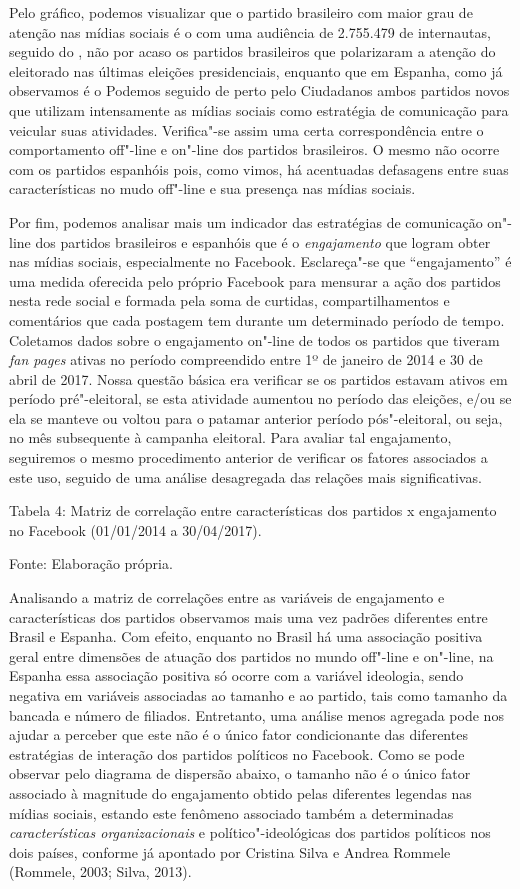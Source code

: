 Pelo gráfico, podemos visualizar que o partido brasileiro com maior grau
de atenção nas mídias sociais é o  com uma audiência de 2.755.479 de
internautas, seguido do , não por acaso os partidos brasileiros que
polarizaram a atenção do eleitorado nas últimas eleições presidenciais,
enquanto que em Espanha, como já observamos é o Podemos seguido de perto
pelo Ciudadanos ambos partidos novos que utilizam intensamente as mídias
sociais como estratégia de comunicação para veicular suas atividades.
Verifica"-se assim uma certa correspondência entre o comportamento
off"-line e on"-line dos partidos brasileiros. O mesmo não ocorre com os
partidos espanhóis pois, como vimos, há acentuadas defasagens entre suas
características no mudo off"-line e sua presença nas mídias sociais.

Por fim, podemos analisar mais um indicador das estratégias de
comunicação on"-line dos partidos brasileiros e espanhóis que é o
\emph{engajamento} que logram obter nas mídias sociais, especialmente no
Facebook. Esclareça"-se que ``engajamento'' é uma medida oferecida pelo
próprio Facebook para mensurar a ação dos partidos nesta rede social e
formada pela soma de curtidas, compartilhamentos e comentários que cada
postagem tem durante um determinado período de tempo. Coletamos dados
sobre o engajamento on"-line de todos os partidos que tiveram \emph{fan
pages} ativas no período compreendido entre 1º de janeiro de 2014 e 30
de abril de 2017. Nossa questão básica era verificar se os partidos
estavam ativos em período pré"-eleitoral, se esta atividade aumentou no
período das eleições, e/ou se ela se manteve ou voltou para o patamar
anterior período pós"-eleitoral, ou seja, no mês subsequente à campanha
eleitoral. Para avaliar tal engajamento, seguiremos o mesmo procedimento
anterior de verificar os fatores associados a este uso, seguido de uma
análise desagregada das relações mais significativas.

Tabela 4: Matriz de correlação entre características dos partidos x
engajamento no Facebook (01/01/2014 a 30/04/2017).

Fonte: Elaboração própria.

Analisando a matriz de correlações entre as variáveis de engajamento e
características dos partidos observamos mais uma vez padrões diferentes
entre Brasil e Espanha. Com efeito, enquanto no Brasil há uma associação
positiva geral entre dimensões de atuação dos partidos no mundo off"-line
e on"-line, na Espanha essa associação positiva só ocorre com a variável
ideologia, sendo negativa em variáveis associadas ao tamanho e ao
partido, tais como tamanho da bancada e número de filiados. Entretanto,
uma análise menos agregada pode nos ajudar a perceber que este não é o
único fator condicionante das diferentes estratégias de interação dos
partidos políticos no Facebook. Como se pode observar pelo diagrama de
dispersão abaixo, o tamanho não é o único fator associado à magnitude do
engajamento obtido pelas diferentes legendas nas mídias sociais, estando
este fenômeno associado também a determinadas \emph{características
organizacionais} e político"-ideológicas dos partidos políticos nos dois
países, conforme já apontado por Cristina Silva e Andrea Rommele
(Rommele, 2003; Silva, 2013).


